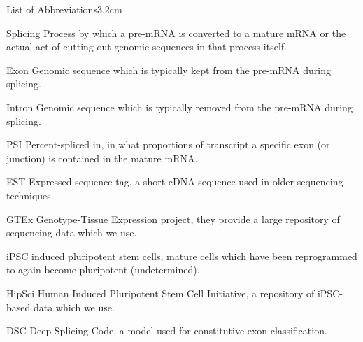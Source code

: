 \begin{mclistof}{List of Abbreviations}{3.2cm}
\item[Splicing] Process by which a pre-mRNA is converted to a mature mRNA or the actual act of cutting out genomic sequences in that process itself.
\item[Exon] Genomic sequence which is typically kept from the pre-mRNA during splicing.
\item[Intron] Genomic sequence which is typically removed from the pre-mRNA during splicing.
\item[PSI] Percent-spliced in, in what proportions of transcript a specific exon (or junction) is contained in the mature mRNA.
\item[EST] Expressed sequence tag, a short cDNA sequence used in older sequencing techniques.
\item[GTEx] Genotype-Tissue Expression project, they provide a large repository of sequencing data which we use.

\item[iPSC] induced pluripotent stem cells, mature cells which have been reprogrammed to again become pluripotent (undetermined).
\item[HipSci] Human Induced Pluripotent Stem Cell Initiative, a repository of iPSC-based data which we use.

\item[DSC] Deep Splicing Code, a model used for constitutive exon classification.



\end{mclistof} 
